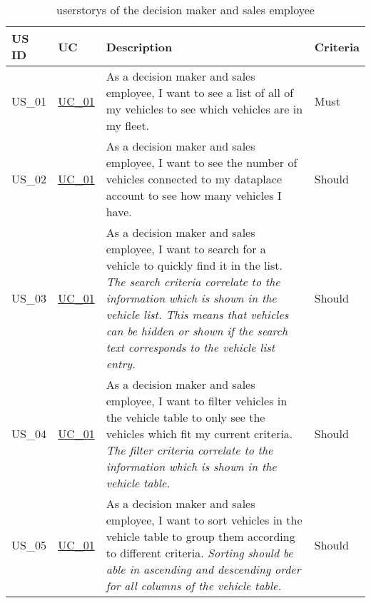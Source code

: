   \sffamily
  \begin{footnotesize}
    \begin{longtable}[L L L L]{ p{} p{} p{} p{}}
      \caption                       %
          {\Glspl{userstory} of the decision maker and sales employee} %
          \\
      \toprule
      \textbf{US ID} & \textbf{UC} & \textbf{Description} & \textbf{Criteria} \\
      \midrule

      \hypertarget{Ref:US1}{US\_01} & \hyperlink{Ref:UC1}{UC\_01} & As a decision maker and sales employee, I want to see a list of all of my vehicles to see which vehicles are in my fleet. & Must \\ 
      
      \rowcolor{Gray}
      \hypertarget{Ref:US2}{US\_02} & \hyperlink{Ref:UC1}{UC\_01} & As a decision maker and sales employee, I want to see the number of vehicles connected to my \gls{dataplace} account to see how many vehicles I have. & Should \\

      \hypertarget{Ref:US3}{US\_03} & \hyperlink{Ref:UC1}{UC\_01} & As a decision maker and sales employee, I want to search for a vehicle to quickly find it in the list.
      \newline
      \emph{The search criteria correlate to the information which is shown in the vehicle list. This means that vehicles can be hidden or shown if the search text corresponds to the vehicle list entry.} & Should
      \\
      
      \rowcolor{Gray}
      \hypertarget{Ref:US4}{US\_04} & \hyperlink{Ref:UC1}{UC\_01} & As a decision maker and sales employee, I want to filter vehicles in the vehicle table to only see the vehicles which fit my current criteria.
      \newline
      \emph{The filter criteria correlate to the information which is shown in the vehicle table.} & Should
      \\

      \hypertarget{Ref:US5}{US\_05} & \hyperlink{Ref:UC1}{UC\_01} & As a decision maker and sales employee, I want to sort vehicles in the vehicle table to group them according to different criteria. 
      \newline
      \emph{Sorting should be able in ascending and descending order for all columns of the vehicle table.} & Should
      \\


\end{longtable}
\end{footnotesize}
